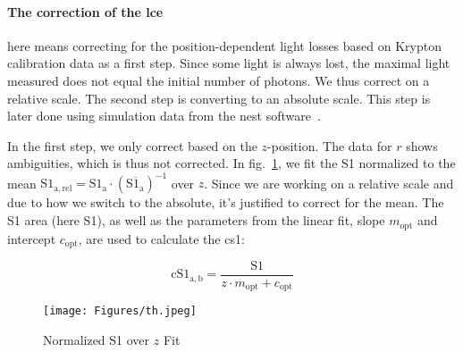 \paragraph{The correction of the \gls{lce}} here means correcting for the position-dependent light losses based on Krypton calibration data as a first step.
Since some light is always lost, the maximal light measured does not equal the initial number of photons.
We thus correct on a relative scale.
The second step is converting to an absolute scale.
This step is later done using simulation data from the \gls{nest} software~\cite{?}.  %

In the first step, we only correct based on the $ z $-position.
The data for $ r $ shows ambiguities, which is thus not corrected.
In fig.~\ref{fig:s1area_vs_z}, we fit the S1 normalized to the mean $ \mathrm{S1_{a,rel}} = \mathrm{S1_a} \cdot \left( \overline{\mathrm{S1_a}} \right)^{-1} $ over $ z $.  %
Since we are working on a relative scale and due to how we switch to the absolute, it's justified to correct for the mean.
The S1 area (here S1), as well as the parameters from the linear fit, slope $ m_\mathrm{opt} $ and intercept $ c_\mathrm{opt} $, are used to calculate the \gls{cs1}:

\begin{equation}
    \mathrm{cS1}_\mathrm{a,b} = \frac{ \mathrm{S1} }{ z \cdot m_\mathrm{opt} + c_\mathrm{opt} }
\end{equation}

\begin{figure}
\centering
    \texttt{[image: Figures/th.jpeg]}  %
\caption[Normalized S1 over $ z $ Fit]{
    Normalized S1 over $ z $ Fit
    }
\label{fig:s1area_vs_z}
\end{figure}












